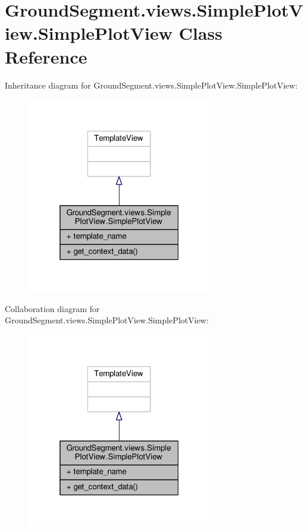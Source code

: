 \hypertarget{class_ground_segment_1_1views_1_1_simple_plot_view_1_1_simple_plot_view}{}\section{Ground\+Segment.\+views.\+Simple\+Plot\+View.\+Simple\+Plot\+View Class Reference}
\label{class_ground_segment_1_1views_1_1_simple_plot_view_1_1_simple_plot_view}


Inheritance diagram for Ground\+Segment.\+views.\+Simple\+Plot\+View.\+Simple\+Plot\+View\+:\nopagebreak
\begin{figure}[H]
\begin{center}
\leavevmode
\includegraphics[width=229pt]{class_ground_segment_1_1views_1_1_simple_plot_view_1_1_simple_plot_view__inherit__graph}
\end{center}
\end{figure}


Collaboration diagram for Ground\+Segment.\+views.\+Simple\+Plot\+View.\+Simple\+Plot\+View\+:\nopagebreak
\begin{figure}[H]
\begin{center}
\leavevmode
\includegraphics[width=229pt]{class_ground_segment_1_1views_1_1_simple_plot_view_1_1_simple_plot_view__coll__graph}
\end{center}
\end{figure}
